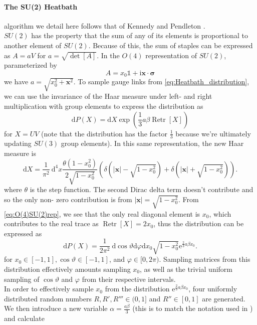 \documentclass[a4paper,10pt]{book}
\begin{document}
\paragraph{The SU(2) Heatbath} algorithm we detail here follows that of Kennedy and Pendleton \cite{KENNEDY1985393}.\\$SU(2)$ has the property that the sum of any of its elements is proportional to another element of $SU(2)$. Because of this, the sum of staples can be expressed as $A = aV$ for $a=\sqrt{\operatorname{det}[A]}$. In the $O(4)$ representation of $SU(2)$, parameterized by 
\begin{equation}\label{eq:O(4)SU(2)rep}
A=x_{0} \mathbb{1}+\mathrm{i} \boldsymbol{x} \cdot \boldsymbol{\sigma}
\end{equation}
we have $a = \sqrt{x_0^2 +\mathbf{x}^2}$. To sample gauge links from \eqref{eq:Heatbath_distribution}, we can use the invariance of the Haar measure under left- and right multiplication with group elements to express the distribution as
\begin{equation}
\mathrm{d} P(X)=\mathrm{d} X \exp \left(\frac{1}{3} a \beta \operatorname{Retr}[X]\right)
\end{equation}
for $X = UV$ (note that the distribution has the factor $\frac{1}{3}$ because we're ultimately updating $SU(3)$ group elements). In this same representation, the new Haar measure is
\begin{equation}
\mathrm{d} X=\frac{1}{\pi^{2}} \mathrm{~d}^{4} x \frac{\theta\left(1-x_{0}^{2}\right)}{2 \sqrt{1-x_{0}^{2}}}\left(\delta\left(|\boldsymbol{x}|-\sqrt{1-x_{0}^{2}}\right)+\delta\left(|\boldsymbol{x}|+\sqrt{1-x_{0}^{2}}\right)\right).
\end{equation}
where $\theta$ is the step function. The second Dirac delta term doesn't contribute
and so the only non- zero contribution is from $|\boldsymbol{x}| = \sqrt{1-x_{0}^{2}}$. From \eqref{eq:O(4)SU(2)rep}, we see that the only real diagonal element is $x_0$, which contributes to the real trace as $\operatorname{Retr}[X] = 2x_0$, thus the distribution can be expressed as 
\begin{equation}
\mathrm{d} P(X)=\frac{1}{2 \pi^{2}} \mathrm{~d} \cos \vartheta \mathrm{d} \varphi \mathrm{d} x_{0} \sqrt{1-x_{0}^{2}} \mathrm{e}^{\frac{2}{3}a \beta x_{0}}.
\end{equation}
for $x_{0} \in[-1,1], \cos \vartheta \in[-1,1]$, and $\varphi \in[0,2 \pi)$.
Sampling matrices from this distribution effectively amounts sampling $ x_{0}$, as well as the trivial uniform sampling of $\cos \vartheta$ and $\varphi$ from their respective intervals.\\In order to effectively sample $x_0$ from the distribution $\mathrm{e}^{\frac{2}{3}a \beta x_{0}}$, four uniformly distributed random numbers $R,R',R''' \in (0,1]$ and $R''\in [0,1]$ are generated. We then introduce a new variable $\alpha =\frac{a\beta}{3} $ (this is to match the notation used in \cite{KENNEDY1985393}) and calculate 
\end{document}
